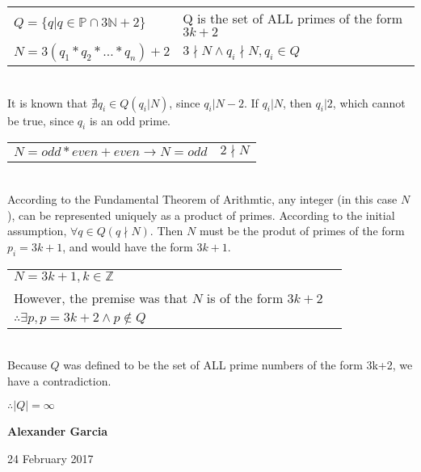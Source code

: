 \documentclass[11pt]{article}
\def\AND{\wedge}
\def\imp{\rightarrow}
\begin{document}
\begin{enumerate}
\begin{tabular}{ll}
			$Q = \{q | q \in \mathbb{P} \cap 3\mathbb{N}+2\}$& Q is the set of ALL primes of the form $3k + 2$ \\

			$N = 3(q_1*q_2*\dots*q_n)+2$ & $3 \nmid N \AND q_i \nmid N, q_i \in Q$ \\ 

		\end{tabular} \\

		It is known that $\nexists q_i \in Q (q_i | N)$, since $q_i | N-2$.
		If $q_i | N$, then $q_i | 2$, which cannot be true, since $q_i$ is an odd prime. \\

		\begin{tabular}{ll}

			$N = odd * even + even \imp N = odd$ & $2 \nmid N$ \\
			
		\end{tabular} \\

		According to the Fundamental Theorem of Arithmtic, any integer (in this case $N$), 
		can be represented uniquely as a product of primes. According to the initial
		assumption, $\forall q \in Q(q \nmid N)$. Then $N$ must be the produt of 
		primes of the form $p_i = 3k + 1$, and would have the form $3k+1$. \\

		\begin{tabular}{ll}

			$N = 3k + 1, k \in \mathbb{Z}$ \\

			However, the premise was that $N$ is of the form $3k + 2$ \\

			$\therefore \exists p, p = 3k + 2 \AND p \not\in Q$ \\

		\end{tabular} \\

		Because $Q$ was defined to be the set of ALL prime numbers of the form 3k+2, we
		have a contradiction.

		$\therefore |Q| = \infty$ \\

		\newpage

		\textbf{Alexander Garcia}

		24 February 2017 \\


\end{enumerate}
\end{document}
